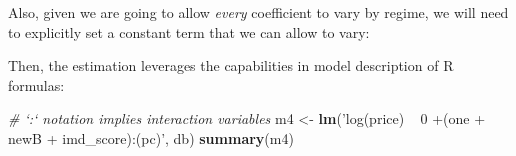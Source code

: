 \documentclass[]{book}
\newenvironment{Shaded}{\begin{snugshade}}{\end{snugshade}}
\newcommand{\KeywordTok}[1]{\textcolor[rgb]{0.13,0.29,0.53}{\textbf{#1}}}
\newcommand{\DecValTok}[1]{\textcolor[rgb]{0.00,0.00,0.81}{#1}}
\newcommand{\StringTok}[1]{\textcolor[rgb]{0.31,0.60,0.02}{#1}}
\newcommand{\CommentTok}[1]{\textcolor[rgb]{0.56,0.35,0.01}{\textit{#1}}}
\newcommand{\OperatorTok}[1]{\textcolor[rgb]{0.81,0.36,0.00}{\textbf{#1}}}
\newcommand{\NormalTok}[1]{#1}
\begin{document}
\begin{Shaded}
\end{Shaded}

Also, given we are going to allow \emph{every} coefficient to vary by
regime, we will need to explicitly set a constant term that we can allow
to vary:

\begin{Shaded}
\end{Shaded}

Then, the estimation leverages the capabilities in model description of
R formulas:

\begin{Shaded}
\begin{Highlighting}[]
\CommentTok{# `:` notation implies interaction variables}
\NormalTok{m4 <-}\StringTok{ }\KeywordTok{lm}\NormalTok{(}\StringTok{'log(price) ~ 0 +(one + newB + imd_score):(pc)'}\NormalTok{, db)}
\KeywordTok{summary}\NormalTok{(m4)}
\end{Highlighting}
\end{Shaded}
\end{document}
